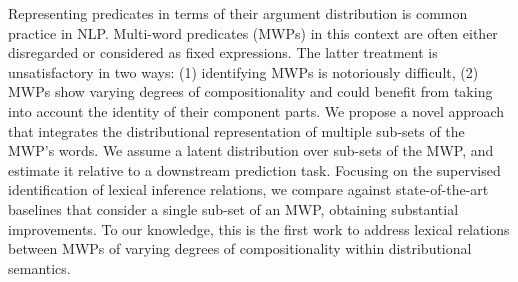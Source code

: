 Representing predicates in terms of their argument distribution is common practice in NLP. Multi-word predicates (MWPs) in this context are often either disregarded or considered as fixed expressions. The latter treatment is unsatisfactory in two ways: (1) identifying MWPs is notoriously difficult, (2) MWPs show varying degrees of compositionality and could benefit from taking into account the identity of their component parts. We propose a novel approach that integrates the distributional representation of multiple sub-sets of the MWP's words. We assume a latent distribution over sub-sets of the MWP, and estimate it relative to a downstream prediction task. Focusing on the supervised identification of lexical inference relations, we compare against state-of-the-art baselines that consider a single sub-set of an MWP, obtaining substantial improvements. To our knowledge, this is the first work to address lexical relations between MWPs of varying degrees of compositionality within distributional semantics.
